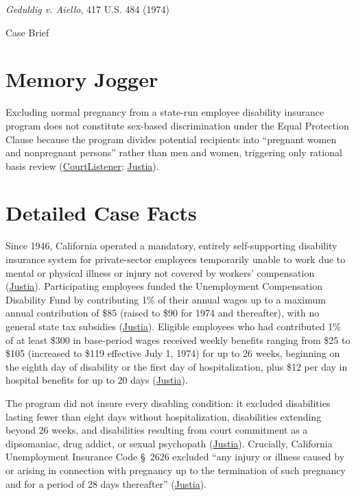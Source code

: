 \documentclass[12pt]{article}
\begin{document}
\begin{center}
{\LARGE \textit{Geduldig v. Aiello}, 417 U.S. 484 (1974)\par}
\vspace{0.8em}
{\large Case Brief\par}
\end{center}
\vspace{1em}

\section{Memory Jogger}

Excluding normal pregnancy from a state-run employee disability insurance program does not constitute sex-based discrimination under the Equal Protection Clause because the program divides potential recipients into ``pregnant women and nonpregnant persons'' rather than men and women, triggering only rational basis review (\href{https://www.courtlistener.com/opinion/109065/geduldig-v-aiello/}{CourtListener}; \href{https://supreme.justia.com/cases/federal/us/417/484/}{Justia}).

\section{Detailed Case Facts}

Since 1946, California operated a mandatory, entirely self-supporting disability insurance system for private-sector employees temporarily unable to work due to mental or physical illness or injury not covered by workers' compensation (\href{https://supreme.justia.com/cases/federal/us/417/484/}{Justia}). Participating employees funded the Unemployment Compensation Disability Fund by contributing 1\% of their annual wages up to a maximum annual contribution of \$85 (raised to \$90 for 1974 and thereafter), with no general state tax subsidies (\href{https://supreme.justia.com/cases/federal/us/417/484/}{Justia}). Eligible employees who had contributed 1\% of at least \$300 in base-period wages received weekly benefits ranging from \$25 to \$105 (increased to \$119 effective July 1, 1974) for up to 26 weeks, beginning on the eighth day of disability or the first day of hospitalization, plus \$12 per day in hospital benefits for up to 20 days (\href{https://supreme.justia.com/cases/federal/us/417/484/}{Justia}).

The program did not insure every disabling condition: it excluded disabilities lasting fewer than eight days without hospitalization, disabilities extending beyond 26 weeks, and disabilities resulting from court commitment as a dipsomaniac, drug addict, or sexual psychopath (\href{https://supreme.justia.com/cases/federal/us/417/484/}{Justia}). Crucially, California Unemployment Insurance Code \S~2626 excluded ``any injury or illness caused by or arising in connection with pregnancy up to the termination of such pregnancy and for a period of 28 days thereafter'' (\href{https://supreme.justia.com/cases/federal/us/417/484/}{Justia}).
\end{document}
